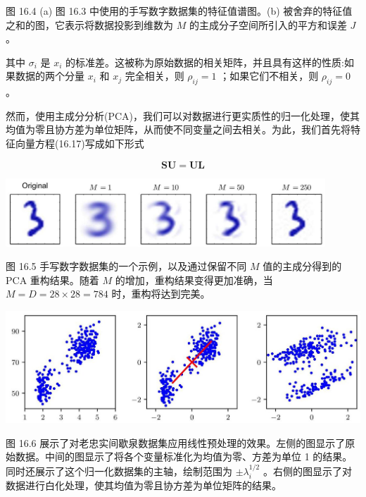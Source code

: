 \documentclass[10pt]{report}
\begin{document}
图 16.4 (a) 图 16.3 中使用的手写数字数据集的特征值谱图。(b) 被舍弃的特征值之和的图，它表示将数据投影到维数为 \(M\) 的主成分子空间所引入的平方和误差 \(J\) 。

其中 \({\sigma }_{i}\) 是 \({x}_{i}\) 的标准差。这被称为原始数据的相关矩阵，并且具有这样的性质:如果数据的两个分量 \({x}_{i}\) 和 \({x}_{j}\) 完全相关，则 \({\rho }_{ij} = 1\) ；如果它们不相关，则 \({\rho }_{ij} = 0\) 。

然而，使用主成分分析(PCA)，我们可以对数据进行更实质性的归一化处理，使其均值为零且协方差为单位矩阵，从而使不同变量之间去相关。为此，我们首先将特征向量方程(16.17)写成如下形式

\[
\mathbf{{SU}} = \mathbf{{UL}} \tag{16.23}
\]

\begin{center}
\includegraphics[max width=0.9\textwidth]{images/0194e279-9b28-703a-88f4-c3ac21e2010d_522_310_1584_1231_264_0.jpg}
\end{center}
\hspace*{3em} 

图 16.5 手写数字数据集的一个示例，以及通过保留不同 \(M\) 值的主成分得到的 PCA 重构结果。随着 \(M\) 的增加，重构结果变得更加准确，当 \(M = D = {28} \times  {28} = {784}\) 时，重构将达到完美。

\begin{center}
\includegraphics[max width=1.0\textwidth]{images/0194e279-9b28-703a-88f4-c3ac21e2010d_523_236_342_1315_416_0.jpg}
\end{center}
\hspace*{3em} 

图 16.6 展示了对老忠实间歇泉数据集应用线性预处理的效果。左侧的图显示了原始数据。中间的图显示了将各个变量标准化为均值为零、方差为单位 1 的结果。同时还展示了这个归一化数据集的主轴，绘制范围为 \(\pm  {\lambda }_{i}^{1/2}\) 。右侧的图显示了对数据进行白化处理，使其均值为零且协方差为单位矩阵的结果。
\end{document}
